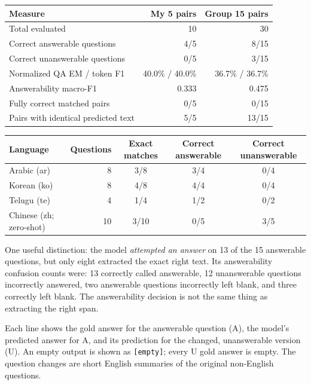\documentclass[10pt,a4paper]{article}
\newcommand{\sectionline}[1]{\vspace{5pt}{\large\bfseries #1}\par\vspace{1pt}}
\begin{document}
\sectionline{2. Results: all questions and language groups}

\begin{center}
\begin{tabularx}{0.94\linewidth}{@{}Y r r@{}}
\toprule
Measure & My 5 pairs & Group 15 pairs\\
\midrule
Total evaluated & 10 & 30\\
Correct answerable questions & 4/5 & 8/15\\
Correct unanswerable questions & 0/5 & 3/15\\
Normalized QA EM / token F1 & 40.0\% / 40.0\% & 36.7\% / 36.7\%\\
Answerability macro-F1 & 0.333 & 0.475\\
Fully correct matched pairs & 0/5 & 0/15\\
Pairs with identical predicted text & 5/5 & 13/15\\
\bottomrule
\end{tabularx}
\end{center}

\vspace{-4pt}

\begin{center}
\begin{tabularx}{0.94\linewidth}{@{}Y r c c c@{}}
\toprule
Language & Questions & Exact matches & Correct answerable & Correct unanswerable\\
\midrule
Arabic (ar) & 8 & 3/8 & 3/4 & 0/4\\
Korean (ko) & 8 & 4/8 & 4/4 & 0/4\\
Telugu (te) & 4 & 1/4 & 1/2 & 0/2\\
Chinese (zh; zero-shot) & 10 & 3/10 & 0/5 & 3/5\\
\bottomrule
\end{tabularx}
\end{center}

One useful distinction: the model \emph{attempted an answer} on 13 of the 15 answerable questions, but only eight extracted the exact right text. Its answerability confusion counts were: 13 correctly called answerable, 12 unanswerable questions incorrectly answered, two answerable questions incorrectly left blank, and three correctly left blank. The answerability decision is not the same thing as extracting the right span.

\newpage

\sectionline{3. What happened to all 15 pairs?}

Each line shows the gold answer for the answerable question (A), the model's predicted answer for A, and its prediction for the changed, unanswerable version (U). An empty output is shown as \texttt{[empty]}; every U gold answer is empty. The question changes are short English summaries of the original non-English questions.
\end{document}
